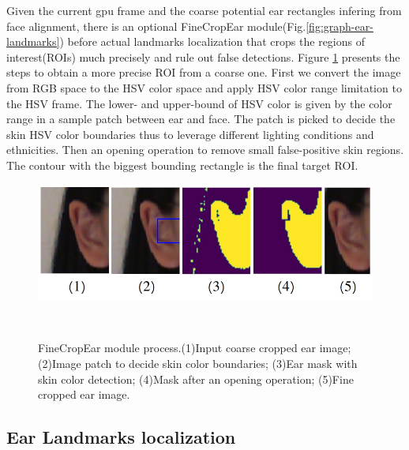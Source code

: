 Given the current gpu frame and the coarse potential ear rectangles infering from face alignment, there is an optional FineCropEar module(Fig.\ref{fig:graph-ear-landmarks}) before actual landmarks localization that crops the regions of interest(ROIs) much precisely and rule out false detections. Figure \ref{fig:fine-crop} presents the steps to obtain a more precise ROI from a coarse one. First we convert the image from RGB space to the HSV color space and apply HSV color range limitation to the HSV frame. The lower- and upper-bound of HSV color is given by the color range in a sample patch between ear and face. The patch is picked to decide the skin HSV color boundaries thus to leverage different lighting conditions and ethnicities. Then an opening operation to remove small false-positive skin regions. The contour with the biggest bounding rectangle is the final target ROI. 
\begin{figure}
  \centering
    \includegraphics[width=\columnwidth]{figures/finecrop.jpg}
    \caption{FineCropEar module process.(1)Input coarse cropped ear image; (2)Image patch to decide skin color boundaries; (3)Ear mask with skin color detection; (4)Mask after an opening operation; (5)Fine cropped ear image.}~\label{fig:fine-crop}
  \end{figure}
  
\subsection{Ear Landmarks localization}
\label{sec:ear-landmarks}

